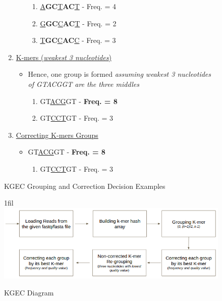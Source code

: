 \documentclass[12pt,openany]{llncs}
\makeatletter
\newcommand*{\centerfloat}{%
  \parindent \z@
  \leftskip \z@ \@plus 1fil \@minus \textwidth
  \rightskip\leftskip
  \parfillskip \z@skip}
\makeatother
\begin{document}
\begin{figure}
\begin{bordered}
\begin{enumerate}
\begin{itemize}
	  \begin{enumerate}
		\item \underline{A}\textbf{GC}\underline{T}\textbf{AC}\underline{T} - Freq. = 4
		\item \underline{G}\textbf{GC}\underline{C}\textbf{AC}\underline{T} - Freq. = 2
		\item \underline{T}\textbf{GC}\underline{C}\textbf{AC}\underline{C} - Freq. = 3
	  \end{enumerate}
	\end{itemize}
	\item \underline{K-mers (\textit{weakest 3 nucleotides})}
	\begin{itemize}
		\item 
	Hence, one group is formed \textit{assuming weakest 3 nucleotides of GTACGGT are the three middles}
		\begin{enumerate}
		\item GT\underline{A}\underline{C}\underline{G}GT - \textbf{Freq. = 8}
		\item GT\underline{C}\underline{C}\underline{T}GT - Freq. = 3
		\end{enumerate}
	\end{itemize}
	\item \underline{Correcting K-mers Groups}
	\begin{itemize}
		\item GT\underline{A}\underline{C}\underline{G}GT - \textbf{Freq. = 8}
		\begin{enumerate}
		\item GT\underline{C}\underline{C}\underline{T}GT - Freq. = 3
		\end{enumerate}
	\end{itemize}
\end{enumerate}
\end{bordered}
\caption{\label{fig:fig-KGEC-EX}KGEC Grouping and Correction Decision Examples}
\end{figure}

\begin{figure}
	\centerfloat
	\includegraphics[width=1.6\linewidth]{./figs/First-Proposal-1}
	\caption{\label{fig:fig-First-Proposal-1}KGEC Diagram}
\end{figure}
\end{document}
